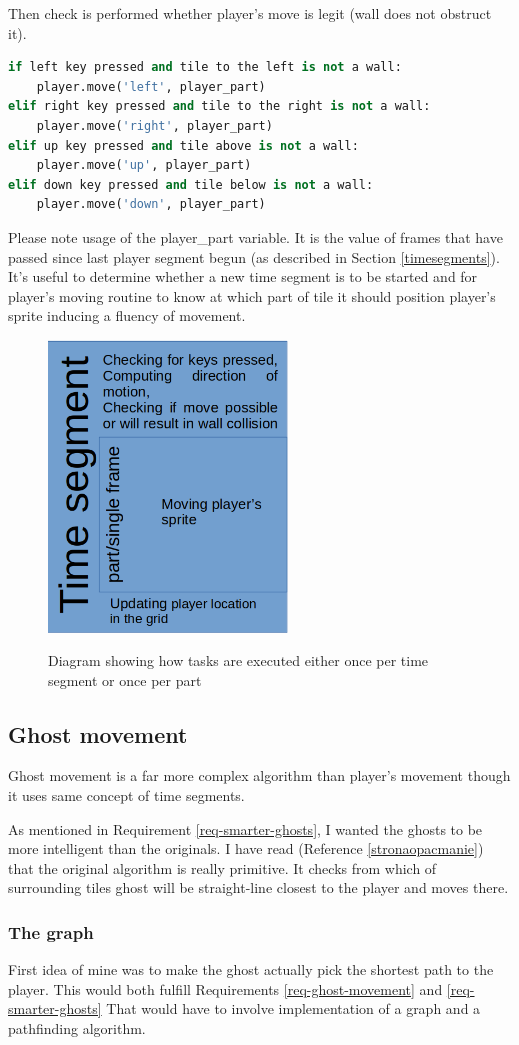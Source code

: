 \documentclass[11pt,a4paper,notitlepage]{report}
\newcommand{\dsubsection}[1]{\FloatBarrier \subsection{#1}}
\newenvironment{img}{
	\begin{center}
		\begin{figure}[H]
			\begin{center}
			
}{
	\end{center}
		\end{figure}
			\end{center}
}
\begin{document}
				Then check is performed whether player's move is legit (wall does not obstruct it).
				\begin{lstlisting}[language=Python]
if left key pressed and tile to the left is not a wall:
	player.move('left', player_part)
elif right key pressed and tile to the right is not a wall:
	player.move('right', player_part)
elif up key pressed and tile above is not a wall:
	player.move('up', player_part)
elif down key pressed and tile below is not a wall:
	player.move('down', player_part)
				\end{lstlisting}
				Please note usage of the player\_part variable. It is the value of frames that have passed since last player segment begun (as described in Section \ref{timesegments}). It's useful to determine whether a new time segment is to be started and for player's moving routine to know at which part of tile it should position player's sprite inducing a fluency of movement.
				\begin{img}
					\includegraphics[width=180pt]{images/movement-diagram}\\
					\caption{Diagram showing how tasks are executed either once per time segment or once per part}
					\label{player-TS}
				\end{img}
			\dsubsection{Ghost movement}
				\label{ghost-movement}
				Ghost movement is a far more complex algorithm than player's movement though it uses same concept of time segments.
				
				As mentioned in Requirement \ref{req-smarter-ghosts}, I wanted the ghosts to be more intelligent than the originals. I have read (Reference \ref{stronaopacmanie}) that the original algorithm is really primitive. It checks from which of surrounding tiles ghost will be straight-line closest to the player and moves there.
				\subsubsection{The graph}
					First idea of mine was to make the ghost actually pick the shortest path to the player. This would both fulfill Requirements \ref{req-ghost-movement} and \ref{req-smarter-ghosts} That would have to involve implementation of a graph and a pathfinding algorithm.
					
\end{document}
